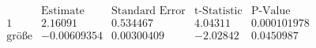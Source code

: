 \[\begin{array}{l|llll}
 \text{} & \text{Estimate} & \text{Standard Error} & \text{t-Statistic} & \text{P-Value} \\
\hline
 1 & 2.16091 & 0.534467 & 4.04311 & 0.000101978 \\
 \text{gr{\" o}{\ss}e} & -0.00609354 & 0.00300409 & -2.02842 & 0.0450987 \\
\end{array}\]

